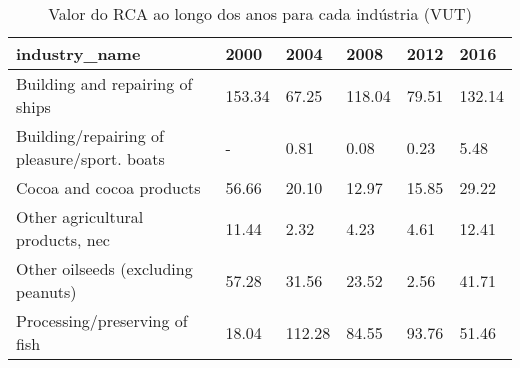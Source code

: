 \begin{table}
\centering
\caption{Valor do RCA ao longo dos anos para cada indústria (VUT)}
\begin{tabular}{p{6cm}p{1.5cm}p{1.5cm}p{1.5cm}p{1.5cm}p{1.5cm}}
\toprule
                              industry\_name &   2000 &   2004 &   2008 &  2012 &   2016 \\
\midrule
            Building and repairing of ships & 153.34 &  67.25 & 118.04 & 79.51 & 132.14 \\
Building/repairing of pleasure/sport. boats &      - &   0.81 &   0.08 &  0.23 &   5.48 \\
                   Cocoa and cocoa products &  56.66 &  20.10 &  12.97 & 15.85 &  29.22 \\
           Other agricultural products, nec &  11.44 &   2.32 &   4.23 &  4.61 &  12.41 \\
         Other oilseeds (excluding peanuts) &  57.28 &  31.56 &  23.52 &  2.56 &  41.71 \\
              Processing/preserving of fish &  18.04 & 112.28 &  84.55 & 93.76 &  51.46 \\
\bottomrule
\end{tabular}
\end{table}
